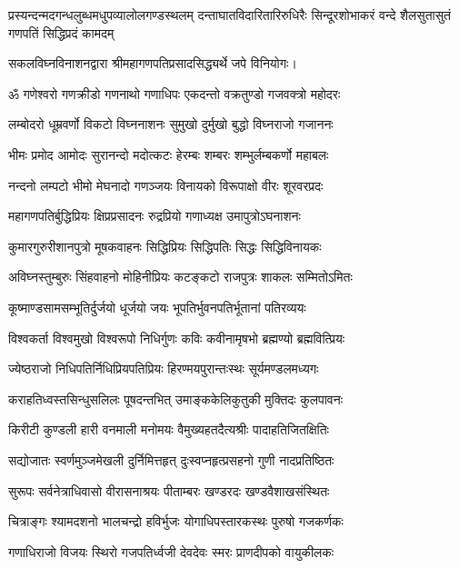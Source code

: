 {प्रस्यन्दन्मदगन्धलुब्धमधुपव्यालोलगण्डस्थलम्}
{दन्ताघातविदारितारिरुधिरैः सिन्दूरशोभाकरं}
{वन्दे शैलसुतासुतं गणपतिं सिद्धिप्रदं कामदम्}

सकलविघ्नविनाशनद्वारा श्रीमहागणपतिप्रसादसिद्ध्यर्थे जपे विनियोगः।



\resetShloka
\twolineshloka
{ॐ गणेश्वरो गणक्रीडो गणनाथो गणाधिपः}
{एकदन्तो वक्रतुण्डो गजवक्त्रो महोदरः}

\twolineshloka
{लम्बोदरो धूम्रवर्णो विकटो विघ्ननाशनः}
{सुमुखो दुर्मुखो बुद्धो विघ्नराजो गजाननः}

\twolineshloka
{भीमः प्रमोद आमोदः सुरानन्दो मदोत्कटः}
{हेरम्बः शम्बरः शम्भुर्लम्बकर्णो महाबलः}

\twolineshloka
{नन्दनो लम्पटो भीमो मेघनादो गणञ्जयः}
{विनायको विरूपाक्षो वीरः शूरवरप्रदः}

\twolineshloka
{महागणपतिर्बुद्धिप्रियः क्षिप्रप्रसादनः}
{रुद्रप्रियो गणाध्यक्ष उमापुत्रोऽघनाशनः}

\twolineshloka
{कुमारगुरुरीशानपुत्रो मूषकवाहनः}
{सिद्धिप्रियः सिद्धिपतिः सिद्धः सिद्धिविनायकः}

\twolineshloka
{अविघ्नस्तुम्बुरुः सिंहवाहनो मोहिनीप्रियः}
{कटङ्कटो राजपुत्रः शाकलः सम्मितोऽमितः}

\twolineshloka
{कूष्माण्डसामसम्भूतिर्दुर्जयो धूर्जयो जयः}
{भूपतिर्भुवनपतिर्भूतानां पतिरव्ययः}

\twolineshloka
{विश्वकर्ता विश्वमुखो विश्वरूपो निधिर्गुणः}
{कविः कवीनामृषभो ब्रह्मण्यो ब्रह्मवित्प्रियः}

\twolineshloka
{ज्येष्ठराजो निधिपतिर्निधिप्रियपतिप्रियः}
{हिरण्मयपुरान्तःस्थः सूर्यमण्डलमध्यगः}

\twolineshloka
{कराहतिध्वस्तसिन्धुसलिलः पूषदन्तभित्}
{उमाङ्ककेलिकुतुकी मुक्तिदः कुलपावनः}

\twolineshloka
{किरीटी कुण्डली हारी वनमाली मनोमयः}
{वैमुख्यहतदैत्यश्रीः पादाहतिजितक्षितिः}

\twolineshloka
{सद्योजातः स्वर्णमुञ्जमेखली दुर्निमित्तहृत्}
{दुःस्वप्नहृत्प्रसहनो गुणी नादप्रतिष्ठितः}

\twolineshloka
{सुरूपः सर्वनेत्राधिवासो वीरासनाश्रयः}
{पीताम्बरः खण्डरदः खण्डवैशाखसंस्थितः}

\twolineshloka
{चित्राङ्गः श्यामदशनो भालचन्द्रो हविर्भुजः}
{योगाधिपस्तारकस्थः पुरुषो गजकर्णकः}

\twolineshloka
{गणाधिराजो विजयः स्थिरो गजपतिर्ध्वजी}
{देवदेवः स्मरः प्राणदीपको वायुकीलकः}

